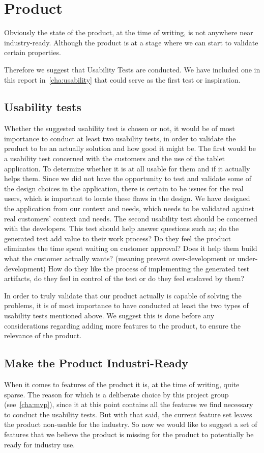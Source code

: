 \section{Product}
Obviously the state of the product, at the time of writing, is not anywhere near industry-ready.
Although the product is at a stage where we can start to validate certain properties.

Therefore we suggest that Usability Tests are conducted.
We have included one in this report in~\autoref{cha:usability} that could serve as the first test or inspiration.

\subsection{Usability tests}
Whether the suggested usability test is chosen or not, it would be of most importance to conduct at least two usability tests, in order to validate the product to be an actually solution and how good it might be.
The first would be a usability test concerned with the customers and the use of the tablet application.
To determine whether it is at all usable for them and if it actually helps them.
Since we did not have the opportunity to test and validate some of the design choices in the application, there is certain to be issues for the real users, which is important to locate these flaws in the design.
We have designed the application from our context and needs, which needs to be validated against real customers' context and needs.
The second usability test should be concerned with the developers.
This test should help answer questions such as; do the generated test add value to their work process? 
Do they feel the product eliminates the time spent waiting on customer approval?
Does it help them build what the customer actually wants? (meaning prevent over-development or under-development)
How do they like the process of implementing the generated test artifacts, do they feel in control of the test or do they feel enslaved by them?

In order to truly validate that our product actually is capable of solving the problems, it is of most importance to have conducted at least the two types of usability tests mentioned above.
We suggest this is done before any considerations regarding adding more features to the product, to ensure the relevance of the product.

\subsection{Make the Product Industri-Ready}
When it comes to features of the product it is, at the time of writing, quite sparse.
The reason for which is a deliberate choice by this project group (see~\autoref{cha:mvp}), since it at this point contains all the features we find necessary to conduct the usability tests.
But with that said, the current feature set leaves the product non-usable for the industry.
So now we would like to suggest a set of features that we believe the product is missing for the product to potentially be ready for industry use.

